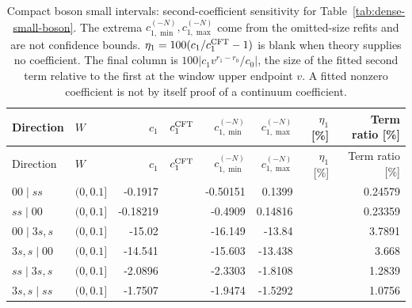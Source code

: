 \begingroup\setlength{\tabcolsep}{3pt}
\begin{longtable}{llrrrrrr}
\caption{Compact boson small intervals: second-coefficient sensitivity for Table~\ref{tab:dense-small-boson}. The extrema $c_{1,\min}^{(-N)},c_{1,\max}^{(-N)}$ come from the omitted-size refits and are not confidence bounds. $\eta_1=100(c_1/c_1^{\rm CFT}-1)$ is blank when theory supplies no coefficient. The final column is $100|c_1v^{r_1-r_0}/c_0|$, the size of the fitted second term relative to the first at the window upper endpoint $v$. A fitted nonzero coefficient is not by itself proof of a continuum coefficient.}
\label{tab:dense-small-boson-second}\\\toprule
Direction & $W$ & $c_1$ & $c_1^{\rm CFT}$ & $c_{1,\min}^{(-N)}$ & $c_{1,\max}^{(-N)}$ & $\eta_1$ [\%] & Term ratio [\%]\\\midrule
\endfirsthead
\toprule
Direction & $W$ & $c_1$ & $c_1^{\rm CFT}$ & $c_{1,\min}^{(-N)}$ & $c_{1,\max}^{(-N)}$ & $\eta_1$ [\%] & Term ratio [\%]\\\midrule
\endhead
\bottomrule\endfoot
$00\mid ss$ & $(0,0.1]$ & -0.1917 &  & -0.50151 & 0.1399 &  & 0.24579\\
$ss\mid 00$ & $(0,0.1]$ & -0.18219 &  & -0.4909 & 0.14816 &  & 0.23359\\
$00\mid 3s,s$ & $(0,0.1]$ & -15.02 &  & -16.149 & -13.84 &  & 3.7891\\
$3s,s\mid 00$ & $(0,0.1]$ & -14.541 &  & -15.603 & -13.438 &  & 3.668\\
$ss\mid 3s,s$ & $(0,0.1]$ & -2.0896 &  & -2.3303 & -1.8108 &  & 1.2839\\
$3s,s\mid ss$ & $(0,0.1]$ & -1.7507 &  & -1.9474 & -1.5292 &  & 1.0756\\
\end{longtable}
\endgroup
